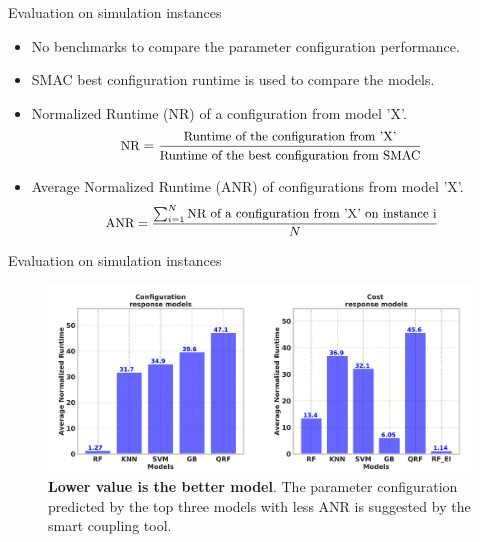 \documentclass[10pt]{beamer}
\begin{document}
\begin{frame}[t]{Evaluation on simulation instances}
\begin{itemize}
\item No benchmarks to compare the parameter configuration performance. 
\newline
\item SMAC best configuration runtime is used to compare the models.
\newline
\item Normalized Runtime (NR) of a configuration from model 'X'.
\newline
\begin{equation}
\small
\text{NR} = \frac{\text{Runtime of the configuration from 'X'}}{\text{Runtime of the best configuration from SMAC}}  
\label{equation:normalized}
\end{equation}
\newline
\item Average Normalized Runtime (ANR) of configurations from model 'X'.
\begin{equation}
\small
\begin{split}
\text{ANR} = \frac{\sum_{i=1}^{N} \text{{NR of a configuration from 'X' on instance i}}}{N}
\label{equation:averagenormalized}
\end{split}
\end{equation}
\newline
\end{itemize}
\end{frame}

\begin{frame}[t]{Evaluation on simulation instances}
\begin{figure}[!ht]
\centering
\includegraphics[width=\linewidth]{images/final-eval-new.pdf}
\captionsetup{justification=justified,margin=0.2cm}
\caption{\textbf{Lower value is the better model}. The parameter configuration predicted by the top three models with less ANR is suggested by the smart coupling tool.}
\label{fig:training_prediction}
\end{figure}
\end{frame}
\end{document}
